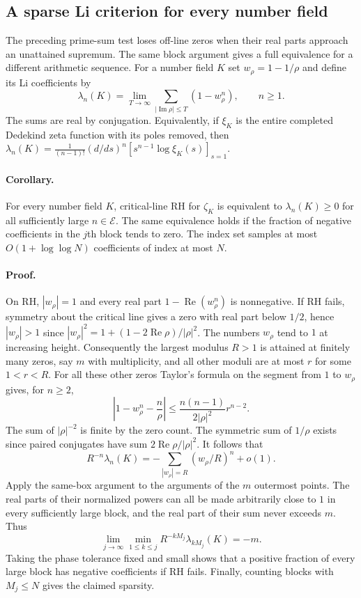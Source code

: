 \subsection{A sparse Li criterion for every number field}

The preceding prime-sum test loses off-line zeros when their real parts
approach an unattained supremum. The same block argument gives a full
equivalence for a different arithmetic sequence. For a number field $K$
set $w_\rho=1-1/\rho$ and define its Li coefficients by
\[
 \lambda_n(K)=\lim_{T\to\infty}\sum_{|\operatorname{Im}\rho|\le T}
            (1-w_\rho^n),\qquad n\ge1.
\]
The sums are real by conjugation. Equivalently, if $\xi_K$ is the entire
completed Dedekind zeta function with its poles removed, then
$\lambda_n(K)=\frac{1}{(n-1)!}(d/ds)^n[s^{n-1}\log\xi_K(s)]_{s=1}$.

\paragraph{Corollary.}
For every number field $K$, critical-line RH for $\zeta_K$ is equivalent
to $\lambda_n(K)\ge0$ for all sufficiently large $n\in\mathcal E$.
The same equivalence holds if the fraction of negative coefficients
in the $j$th block tends to zero. The index set samples at most
$O(1+\log\log N)$ coefficients of index at most $N$.

\paragraph{Proof.}
On RH, $|w_\rho|=1$ and every real part $1-\operatorname{Re}(w_\rho^n)$
is nonnegative. If RH fails, symmetry about the critical line gives
a zero with real part below $1/2$, hence $|w_\rho|>1$ since
$|w_\rho|^2=1+(1-2\operatorname{Re}\rho)/|\rho|^2$. The numbers
$w_\rho$ tend to $1$ at increasing height. Consequently the largest
modulus $R>1$ is attained at finitely many zeros, say $m$ with
multiplicity, and all other moduli are at most $r$ for some $1<r<R$.
For all these other zeros Taylor's formula on the segment from $1$ to
$w_\rho$ gives, for $n\ge2$,
\[
 \left|1-w_\rho^n-\frac n\rho\right|
 \le \frac{n(n-1)}{2|\rho|^2}r^{n-2}.
\]
The sum of $|\rho|^{-2}$ is finite by the zero count. The symmetric sum
of $1/\rho$ exists since paired conjugates have sum
$2\operatorname{Re}\rho/|\rho|^2$. It follows that
\[
 R^{-n}\lambda_n(K)
 =-\sum_{|w_\rho|=R}(w_\rho/R)^n+o(1).
\]
Apply the same-box argument to the arguments of the $m$ outermost
points. The real parts of their normalized powers can all be made
arbitrarily close to $1$ in every sufficiently large block, and the
real part of their sum never exceeds $m$. Thus
\[
 \lim_{j\to\infty}\min_{1\le k\le j}
 R^{-kM_j}\lambda_{kM_j}(K)=-m.
\]
Taking the phase tolerance fixed and small shows that a positive
fraction of every large block has negative coefficients if RH fails.
Finally, counting blocks with $M_j\le N$ gives the claimed sparsity.

